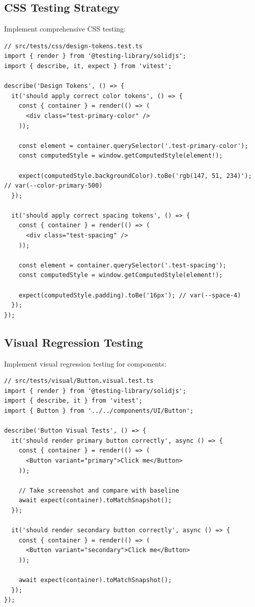\documentclass[11pt]{article}
\begin{document}
\subsection{CSS Testing Strategy}

Implement comprehensive CSS testing:

\begin{lstlisting}[style=typescript]
// src/tests/css/design-tokens.test.ts
import { render } from '@testing-library/solidjs';
import { describe, it, expect } from 'vitest';

describe('Design Tokens', () => {
  it('should apply correct color tokens', () => {
    const { container } = render(() => (
      <div class="test-primary-color" />
    ));
    
    const element = container.querySelector('.test-primary-color');
    const computedStyle = window.getComputedStyle(element!);
    
    expect(computedStyle.backgroundColor).toBe('rgb(147, 51, 234)'); // var(--color-primary-500)
  });

  it('should apply correct spacing tokens', () => {
    const { container } = render(() => (
      <div class="test-spacing" />
    ));
    
    const element = container.querySelector('.test-spacing');
    const computedStyle = window.getComputedStyle(element!);
    
    expect(computedStyle.padding).toBe('16px'); // var(--space-4)
  });
});
\end{lstlisting}

\subsection{Visual Regression Testing}

Implement visual regression testing for components:

\begin{lstlisting}[style=typescript]
// src/tests/visual/Button.visual.test.ts
import { render } from '@testing-library/solidjs';
import { describe, it } from 'vitest';
import { Button } from '../../components/UI/Button';

describe('Button Visual Tests', () => {
  it('should render primary button correctly', async () => {
    const { container } = render(() => (
      <Button variant="primary">Click me</Button>
    ));
    
    // Take screenshot and compare with baseline
    await expect(container).toMatchSnapshot();
  });

  it('should render secondary button correctly', async () => {
    const { container } = render(() => (
      <Button variant="secondary">Click me</Button>
    ));
    
    await expect(container).toMatchSnapshot();
  });
});
\end{lstlisting}
\end{document}
